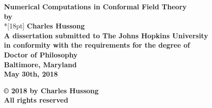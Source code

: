 \documentclass[12pt]{report}
\numberwithin{equation}{section}
\begin{document}
\newcommand{\bm}[1]{ \mbox{\boldmath $ #1 $} }
\newcommand{\bin}[2]{\left(\begin{array}{@{}c@{}} #1 \\ #2
             \end{array}\right) }
\renewcommand{\contentsname}{Table of Contents}
\baselineskip=24pt
 
\thispagestyle{empty}
\begin{center}
\vspace*{.25in}
{\bf\LARGE{ Numerical Computations in Conformal Field Theory }}\\
\vspace*{.75in}
{\bf by} \\*[18pt]
\vspace*{.2in}
{\bf Charles Hussong}\\
\vspace*{1in}
{\bf A dissertation submitted to The Johns Hopkins University\\
in conformity with the requirements for the degree of\\
Doctor of Philosophy }\\
\vspace*{.75in}
{\bf Baltimore, Maryland} \\
{\bf May 30th, 2018} \\     %
\vspace*{.5in}
\begin{small}
{\bf \copyright{ }2018 by Charles Hussong} \\
{\bf All rights reserved}
\end{small}
\end{center}
\newpage 

\pagestyle{plain}
\setcounter{page}{2}




\pagestyle{plain}
\baselineskip=24pt
\tableofcontents
\listoffigures
\end{document}
